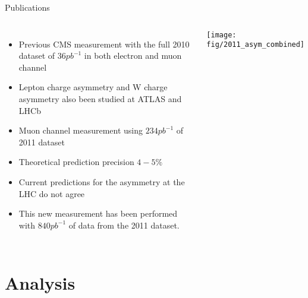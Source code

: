 \documentclass[t, 8pt]{beamer}
\begin{document}
\begin{frame}{Publications}
  \begin{columns}[c]
  \begin{itemize}
    \item Previous CMS measurement with the full 2010 dataset of $36 pb^{-1}$ in both electron and muon channel
    \item Lepton charge asymmetry and W charge asymmetry also been studied at ATLAS and LHCb
    \item Muon channel measurement using $234pb^{-1}$ of 2011 dataset
    \item Theoretical prediction precision $4-5 \%$
    \item Current predictions for the asymmetry at the LHC do not agree
    \vspace{0.25cm}
    \item This new measurement has been performed with $840pb^{-1}$ of data from the 2011 dataset.
  \end{itemize}
    \texttt{[image: fig/2011\_asym\_combined]}
  \end{columns}
\end{frame}






\section{Analysis}
\end{document}

